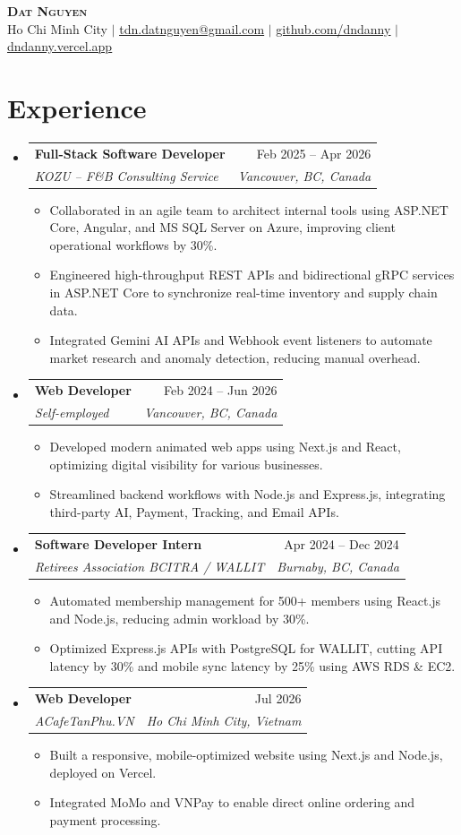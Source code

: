 \documentclass[letterpaper,11pt]{article}
\makeatletter
\newcommand{\resumeItem}[1]{
\item\small{
{#1 \vspace{-2pt}}
}
}
\newcommand{\resumeSubheading}[4]{
\vspace{-2pt}\item
\begin{tabular*}{0.97\textwidth}[t]{l@{\extracolsep{\fill}}r}
\textbf{#1} & #2 \\
\textit{\small#3} & \textit{\small #4} \\
\end{tabular*}\vspace{-7pt}
}
\newcommand{\resumeSubHeadingListStart}{\begin{itemize}[leftmargin=0.15in, label={}]}
\newcommand{\resumeSubHeadingListEnd}{\end{itemize}}
\newcommand{\resumeItemListStart}{\begin{itemize}}
\newcommand{\resumeItemListEnd}{\end{itemize}\vspace{-5pt}}
\makeatother
\begin{document}
\begin{center}
\textbf{\Huge \scshape Dat Nguyen} \\ \vspace{1pt}
\small Ho Chi Minh City $|$ \href{mailto:tdn.datnguyen@gmail.com}{\underline{tdn.datnguyen@gmail.com}} $|$
\href{https://github.com/dndanny}{\underline{github.com/dndanny}} $|$
\href{https://dndanny.vercel.app}{\underline{dndanny.vercel.app}}
\end{center}

\section{Experience}
\resumeSubHeadingListStart
\resumeSubheading{Full-Stack Software Developer}{Feb 2025 -- Apr 2026}{KOZU -- F\&B Consulting Service}{Vancouver, BC, Canada}
\resumeItemListStart
\resumeItem{Collaborated in an agile team to architect internal tools using ASP.NET Core, Angular, and MS SQL Server on Azure, improving client operational workflows by 30\%.}
\resumeItem{Engineered high-throughput REST APIs and bidirectional gRPC services in ASP.NET Core to synchronize real-time inventory and supply chain data.}
\resumeItem{Integrated Gemini AI APIs and Webhook event listeners to automate market research and anomaly detection, reducing manual overhead.}
\resumeItemListEnd

\resumeSubheading{Web Developer}{Feb 2024 -- Jun 2026}{Self-employed}{Vancouver, BC, Canada}
\resumeItemListStart
\resumeItem{Developed modern animated web apps using Next.js and React, optimizing digital visibility for various businesses.}
\resumeItem{Streamlined backend workflows with Node.js and Express.js, integrating third-party AI, Payment, Tracking, and Email APIs.}
\resumeItemListEnd

\resumeSubheading{Software Developer Intern}{Apr 2024 -- Dec 2024}{Retirees Association BCITRA / WALLIT}{Burnaby, BC, Canada}
\resumeItemListStart
\resumeItem{Automated membership management for 500+ members using React.js and Node.js, reducing admin workload by 30\%.}
\resumeItem{Optimized Express.js APIs with PostgreSQL for WALLIT, cutting API latency by 30\% and mobile sync latency by 25\% using AWS RDS \& EC2.}
\resumeItemListEnd

\resumeSubheading{Web Developer}{Jul 2026}{ACafeTanPhu.VN}{Ho Chi Minh City, Vietnam}
\resumeItemListStart
\resumeItem{Built a responsive, mobile-optimized website using Next.js and Node.js, deployed on Vercel.}
\resumeItem{Integrated MoMo and VNPay to enable direct online ordering and payment processing.}
\resumeItemListEnd
\resumeSubHeadingListEnd
\end{document}
